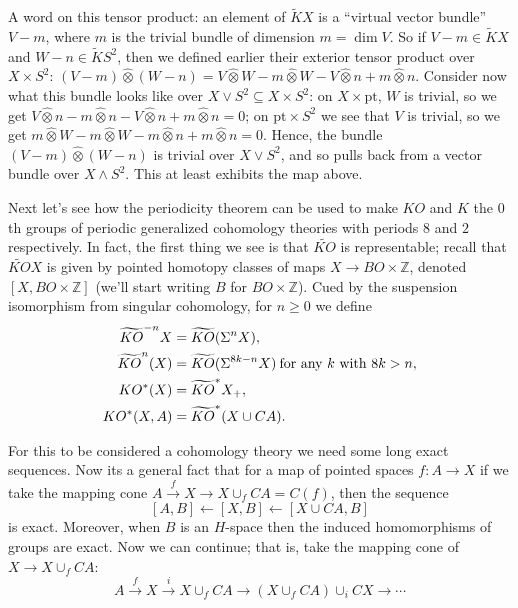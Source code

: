 \documentclass{article}
\newcommand{\Z}{\mathbb{Z}}
\newcommand{\sprod}{\wedge}
\newcommand{\wsum}{\vee}
\newcommand{\ptspace}{\mathrm{pt}}
\newcommand{\Suspend}{\Sigma}
\newcommand{\from}{\leftarrow}
\begin{document}
A word on this tensor product: an element of $\widetilde K X$ is a ``virtual vector bundle'' $V - m$, where $m$ is the trivial bundle of dimension $m = \dim V$.  So if $V - m \in \widetilde KX$ and $W - n \in \widetilde KS^2$, then we defined earlier their exterior tensor product over $X \times S^2$: $(V - m)\hat\otimes(W - n) = V \hat\otimes W - m \hat\otimes W - V \hat\otimes n + m \hat\otimes n$.  Consider now what this bundle looks like over $X \vee S^2 \subseteq X \times S^2$: on $X \times \ptspace$, $W$ is trivial, so we get $V \hat\otimes n - m \hat\otimes n - V \hat\otimes n + m \hat\otimes n = 0$; on $\ptspace \times S^2$ we see that $V$ is trivial, so we get $m \hat\otimes W - m \hat\otimes W - m \hat\otimes n + m \hat\otimes n = 0$.  Hence, the bundle $(V - m) \hat\otimes (W - n)$ is trivial over $X \wsum S^2$, and so pulls back from a vector bundle over $X \sprod S^2$.  This at least exhibits the map above.

Next let's see how the periodicity theorem can be used to make $KO$ and $K$ the $0$th groups of periodic generalized cohomology theories with periods $8$ and $2$ respectively.  In fact, the first thing we see is that $\widetilde{KO}$ is representable; recall that $\widetilde{KO} X$ is given by pointed homotopy classes of maps $X \to BO \times \Z$, denoted $[X, BO \times \Z]$ (we'll start writing $B$ for $BO \times \Z$).  Cued by the suspension isomorphism from singular cohomology, for $n \ge 0$ we define
\begin{align*}
\widetilde{KO}^{-n} X & = \widetilde{KO}(\Suspend^n X), \\
\widetilde{KO}^n(X) & = \widetilde{KO}(\Suspend^{8k-n}X) \hbox{\:for any $k$ with $8k > n$}, \\
KO^*(X) &= \widetilde{KO}^* X_+, \\
KO^*(X, A) & = \widetilde{KO}^*(X \cup CA).
\end{align*}

For this to be considered a cohomology theory we need some long exact sequences.  Now its a general fact that for a map of pointed spaces $f: A \to X$ if we take the mapping cone $A \stackrel{f}{\to} X \to X \cup_f CA = C(f)$, then the sequence
\[
[A, B] \from [X, B] \from [X \cup CA, B]
\]
is exact.  Moreover, when $B$ is an $H$-space then the induced homomorphisms of groups are exact.  Now we can continue; that is, take the mapping cone of $X \to X \cup_f CA$:
\[
A \stackrel{f}{\to} X \stackrel{i}{\to} X \cup_f CA \to (X \cup_f CA) \cup_i CX \to \cdots
\]
\end{document}
